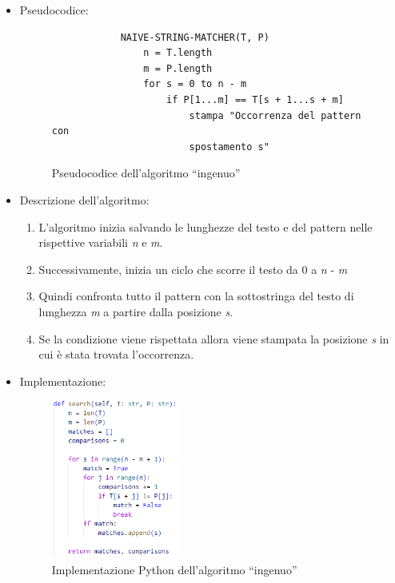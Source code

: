 \documentclass{article}
\begin{document}
\begin{itemize}
    \item Pseudocodice:
          \begin{figure}[H]
              \centering
              \begin{lstlisting}
            NAIVE-STRING-MATCHER(T, P)
                n = T.length
                m = P.length
                for s = 0 to n - m
                    if P[1...m] == T[s + 1...s + m]
                        stampa "Occorrenza del pattern con
                        spostamento s"
            \end{lstlisting}
              \caption{Pseudocodice dell'algoritmo ``ingenuo''}
              \label{fig:naive-pseudocode}
          \end{figure}
    \item Descrizione dell'algoritmo:
          \begin{enumerate}
              \item L'algoritmo inizia salvando le lunghezze del testo e del pattern nelle rispettive variabili \textit{n} e \textit{m}.
              \item Successivamente, inizia un ciclo che scorre il testo da 0 a \textit{n} - \textit{m}
              \item Quindi confronta tutto il pattern con la sottostringa del testo di lunghezza \textit{m} a partire dalla posizione \textit{s}.
              \item Se la condizione viene rispettata allora viene stampata la posizione \textit{s} in cui è stata trovata l'occorrenza.
          \end{enumerate}
    \item Implementazione:
          \begin{figure}[H]
              \centering
              \includegraphics[width=0.4\textwidth]{img/Naive_search.png}
              \caption{Implementazione Python dell'algoritmo ``ingenuo''}

\end{figure}
\end{itemize}
\end{document}
